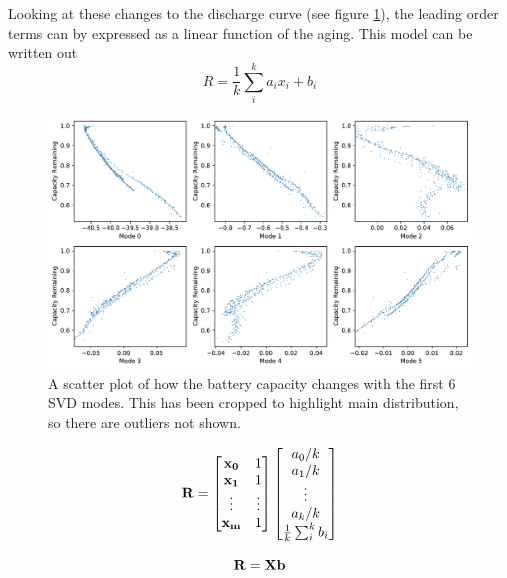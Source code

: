 \documentclass{article}
\begin{document}
    Looking at these changes to the discharge curve (see figure
    \ref{fig:svd_proj}), the leading order terms can by expressed as a linear
    function of the aging. This model can be written out
    \begin{equation}
        R = \frac{1}{k}
            \sum_i^k a_i x_i + b_i
    \end{equation}

    \begin{figure}[tbp]
        \includegraphics[width=\textwidth]{mode_proj.pdf}
        \caption{\label{fig:svd_proj} A scatter plot of how the battery
        capacity changes with the first 6 SVD modes. This has been cropped
        to highlight main distribution, so there are outliers not shown.}
    \end{figure}

    \begin{equation}
        \vb{R} = \begin{bmatrix}
            \vb{x_0} & 1 \\ \vb{x_1} & 1 \\ \vdots & \vdots \\ \vb{x_m} & 1
        \end{bmatrix}
        \begin{bmatrix}
            a_0/k \\
            a_1/k \\
            \vdots \\
            a_k/k \\
            \frac{1}{k} \sum_i^k b_i
        \end{bmatrix}
    \end{equation}

    \begin{equation*}
        \vb{R} = \vb{X} \vb{b}
    \end{equation*}
\end{document}
